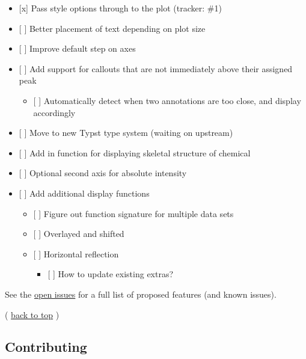 \begin{itemize}
\tightlist
\item
  {[}x{]} Pass style options through to the plot (tracker: \#1)
\item
  {[} {]} Better placement of text depending on plot size
\item
  {[} {]} Improve default step on axes
\item
  {[} {]} Add support for callouts that are not immediately above their
  assigned peak

  \begin{itemize}
  \tightlist
  \item
    {[} {]} Automatically detect when two annotations are too close, and
    display accordingly
  \end{itemize}
\item
  {[} {]} Move to new Typst type system (waiting on upstream)
\item
  {[} {]} Add in function for displaying skeletal structure of chemical
\item
  {[} {]} Optional second axis for absolute intensity
\item
  {[} {]} Add additional display functions

  \begin{itemize}
  \tightlist
  \item
    {[} {]} Figure out function signature for multiple data sets
  \item
    {[} {]} Overlayed and shifted
  \item
    {[} {]} Horizontal reflection

    \begin{itemize}
    \tightlist
    \item
      {[} {]} How to update existing extras?
    \end{itemize}
  \end{itemize}
\end{itemize}

See the \href{https://github.com/jamesxx/ionio-illustrate/issues}{open
issues} for a full list of proposed features (and known issues).

(
\href{https://github.com/typst/packages/raw/main/packages/preview/ionio-illustrate/0.2.0/\#readme-top}{back
to top} )

\subsection{Contributing}\label{contributing}

